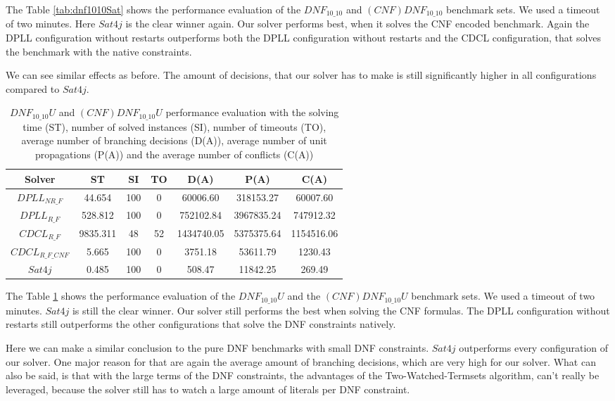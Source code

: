 The Table \ref{tab:dnf1010Sat} shows the performance evaluation of the $DNF_{10\_10}$ and $(CNF)DNF_{10\_10}$ benchmark sets. We used a timeout of two minutes. Here $Sat4j$ is the clear winner again. Our solver performs best, when it solves the CNF encoded benchmark. Again the DPLL configuration without restarts outperforms both the DPLL configuration without restarts and the CDCL configuration, that solves the benchmark with the native constraints.

We can see similar effects as before. The amount of decisions, that our solver has to make is still significantly higher in all configurations compared to $Sat4j$.

\begin{table}[!htb]
\centering
\caption[$DNF_{10\_10}U$ and $(CNF)DNF_{10\_10}U$ performance evaluation]{$DNF_{10\_10}U$ and $(CNF)DNF_{10\_10}U$ performance evaluation with the solving time (ST), number of solved instances (SI), number of timeouts (TO), average number of branching decisions (D(A)), average number of unit propagations (P(A)) and the average number of conflicts (C(A))}
\label{tab:dnf1010Unsat}
\begin{tabular}{|c|c|c|c|c|c|c|}
\hline
Solver & ST & SI & TO & D(A) & P(A) & C(A)\\ 
\hline
$DPLL_{NR\_F}$ & 44.654 & 100 & 0 & 60006.60 & 318153.27 & 60007.60 \\ 
\hline
$DPLL_{R\_F}$ & 528.812 & 100 & 0 & 752102.84 & 3967835.24 & 747912.32 \\ 
\hline
$CDCL_{R\_F}$ & 9835.311 & 48 & 52 & 1434740.05 & 5375375.64 & 1154516.06 \\ 
\hline
$CDCL_{R\_F\_CNF}$ & 5.665 & 100 & 0 & 3751.18 & 53611.79 & 1230.43 \\ 
\hline
$Sat4j$ & 0.485 & 100 & 0 & 508.47 & 11842.25 & 269.49 \\ 
\hline
\end{tabular}
\end{table}

The Table \ref{tab:dnf1010Unsat} shows the performance evaluation of the $DNF_{10\_10}U$ and the $(CNF)DNF_{10\_10}U$ benchmark sets. We used a timeout of two minutes. $Sat4j$ is still the clear winner. Our solver still performs the best when solving the CNF formulas. The DPLL configuration without restarts still outperforms the other configurations that solve the DNF constraints natively.

Here we can make a similar conclusion to the pure DNF benchmarks with small DNF constraints. $Sat4j$ outperforms every configuration of our solver. One major reason for that are again the average amount of branching decisions, which are very high for our solver. What can also be said, is that with the large terms of the DNF constraints, the advantages of the Two-Watched-Termsets algorithm, can't really be leveraged, because the solver still has to watch a large amount of literals per DNF constraint.

